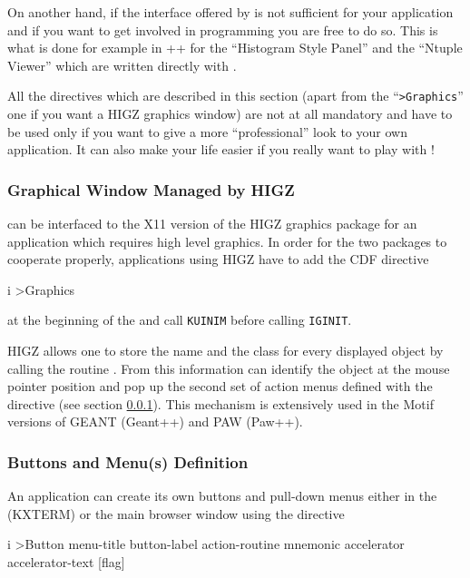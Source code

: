 On another hand, if the interface offered by \KUIPMotif{} is not sufficient 
for your application and if you want to get involved in \Motif{} programming 
you are free to do so. This is what is done for example in \PAW++{} for the 
``Histogram Style Panel'' and the ``Ntuple Viewer'' which are 
written directly with \Motif{}.

All the directives which are described in this section (apart from the
``{\tt >Graphics}'' one if you want a HIGZ graphics window) are not at all
mandatory and have to be used only if you want to give a more 
``professional'' look to your own application. It can also make your life
easier if you really want to play with \Motif{} !


\subsubsection{Graphical Window Managed by HIGZ}
\label{ref:regraph2}

\KUIPMotif{} can be interfaced to the X11 version of the HIGZ graphics package
for an application which requires high level graphics.
In order for the two packages to cooperate properly, applications
using HIGZ have to add the CDF directive
\begin{Gray}{i}
>Graphics
\end{Gray}
at the beginning of the \CDF{} and call {\tt KUINIM} before calling {\tt IGINIT}.
 
HIGZ allows one to store the name and the class for
every displayed object by calling the routine .
From this information \KUIPMotif{} can identify the object at the mouse
pointer position and pop up the second set of action menus defined with the
 directive (see section \ref{ref:regraph2}). This mechanism is
extensively used in the Motif versions of GEANT (Geant++) and PAW (Paw++).
 
 
\subsubsection{Buttons and Menu(s) Definition}

An application can create its own buttons and pull-down menus either in the
\EW{} (KXTERM) or the main browser window using the \CDF{} directive
\begin{Gray}{i}
>Button menu-title button-label action-routine mnemonic
        accelerator accelerator-text [flag]
\end{Gray}
 
